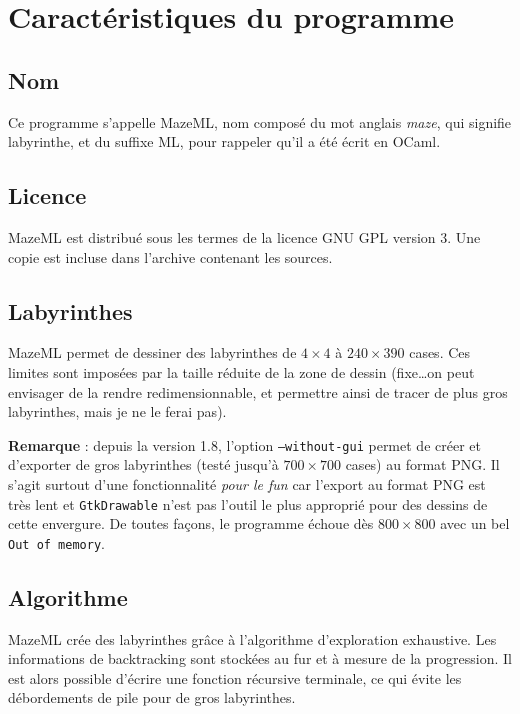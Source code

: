 \documentclass[11pt]{article}
\begin{document}
  \section{Caractéristiques du programme}

    \subsection{Nom}

    Ce programme s'appelle MazeML, nom composé du mot anglais \textit{maze}, qui
  signifie labyrinthe, et du suffixe ML, pour rappeler qu'il a été écrit en 
  OCaml.

    \subsection{Licence}

    MazeML est distribué sous les termes de la licence GNU GPL version 3. Une 
  copie est incluse dans l'archive contenant les sources.

    \subsection{Labyrinthes}

    MazeML permet de dessiner des labyrinthes de $4 \times 4$ à $240 \times 390$
  cases. Ces limites sont imposées par la taille réduite de la zone de dessin 
  (fixe\ldots on peut envisager de la rendre redimensionnable, et permettre 
  ainsi de tracer de plus gros labyrinthes, mais je ne le ferai pas).

  \vspace{3mm}
  \textbf{Remarque} : depuis la version 1.8, l'option \texttt{--without-gui} 
  permet de créer et d'exporter de gros labyrinthes (testé jusqu'à 
  $700 \times 700$ cases) au format PNG. Il s'agit surtout d'une fonctionnalité
  \emph{pour le fun} car l'export au format PNG est très lent et 
  \texttt{GtkDrawable} n'est pas l'outil le plus approprié pour des dessins de 
  cette envergure. De toutes façons, le programme échoue dès $800 \times 800$ 
  avec un bel \texttt{Out of memory}.

    \subsection{Algorithme}

    MazeML crée des labyrinthes grâce à l'algorithme d'exploration exhaustive. 
  Les informations de backtracking sont stockées au fur et à mesure de la 
  progression. Il est alors possible d'écrire une fonction récursive terminale, 
  ce qui évite les débordements de pile pour de gros labyrinthes.
\end{document}
